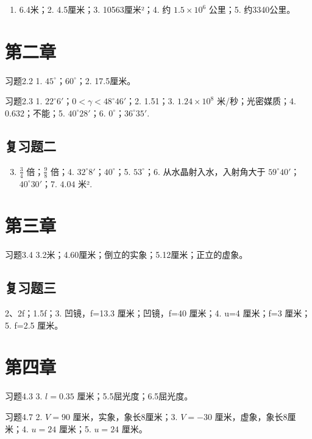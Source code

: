 \begin{enumerate}
\item
  6.4米；2. 4.5厘米；3. 10563厘米²；4. 约 \(1.5 \times 10^{6}\) 公里；5.
  约3340公里。
\end{enumerate}

\section{第二章}

习题2.2 1. \(45^{\circ}\)；\(60^{\circ}\)；2. 17.5厘米。

习题2.3 1. \(22^{\circ}6'\)；\(0 < \gamma < 48^{\circ}46'\)；2. 1.51；3.
\(1.24 \times 10^{8}\) 米/秒；光密媒质；4. 0.632；不能；5.
\(40^{\circ}28'\)；6. \(0^{\circ}\)；\(36^{\circ}35'\).

\subsection{复习题二}

\begin{enumerate}
\setcounter{enumi}{2}
\item
  \(\frac{3}{4}\) 倍；\(\frac{9}{8}\) 倍；4.
  \(32^{\circ}8'\)；\(40^{\circ}\)；5. \(53^{\circ}\)；6.
  从水晶射入水，入射角大于 \(59^{\circ}40'\)；\(40^{\circ}30'\)；7.
  \(4.04\) 米².
\end{enumerate}

\section{第三章}

习题3.4 3.2米；4.60厘米；倒立的实象；5.12厘米；正立的虚象。

\subsection{复习题三}

2、2f；1.5f；3. 凹镜，f=13.3 厘米；凹镜，f=40 厘米；4. u=4 厘米；f=3
厘米；5. f=2.5 厘米。

\section{第四章}

习题4.3 3. \(l = 0.35\) 厘米；5.5屈光度；6.5屈光度。

习题4.7 2. \(V = 90\) 厘米，实象，象长8厘米；3. \(V = -30\)
厘米，虚象，象长8厘米；4. \(u = 24\) 厘米；5. \(u = 24\) 厘米。


